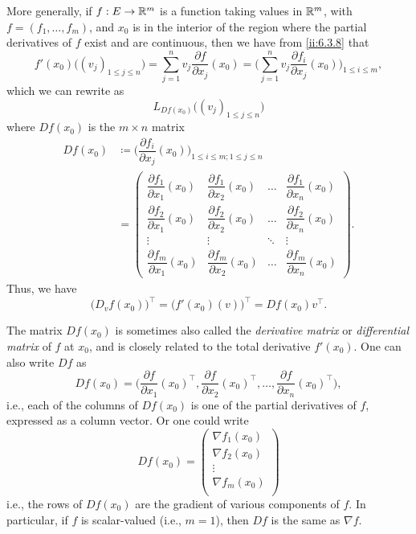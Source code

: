 \begin{ac}\label{ii:ac:6.3.4}
  More generally, if \(f : E \to \mathbb{R}^m\) is a function taking values in \(\mathbb{R}^m\), with \(f = (f_1, \dots, f_m)\), and \(x_0\) is in the interior of the region where the partial derivatives of \(f\) exist and are continuous, then we have from \cref{ii:6.3.8} that
  \[
    f'(x_0)\big((v_j)_{1 \leq j \leq n}\big) = \sum_{j = 1}^n v_j \dfrac{\partial f}{\partial x_j}(x_0) = \bigg(\sum_{j = 1}^n v_j \dfrac{\partial f_i}{\partial x_j}(x_0)\bigg)_{1 \leq i \leq m},
  \]
  which we can rewrite as
  \[
    L_{D f(x_0)}\big((v_j)_{1 \leq j \leq n}\big)
  \]
  where \(D f(x_0)\) is the \(m \times n\) matrix
  \begin{align*}
    D f(x_0) & \coloneqq \bigg(\dfrac{\partial f_i}{\partial x_j}(x_0)\bigg)_{1 \leq i \leq m ; 1 \leq j \leq n}                                      \\
             & = \begin{pmatrix}
                   \dfrac{\partial f_1}{\partial x_1}(x_0) & \dfrac{\partial f_1}{\partial x_2}(x_0) & \dots  & \dfrac{\partial f_1}{\partial x_n}(x_0) \\
                   \dfrac{\partial f_2}{\partial x_1}(x_0) & \dfrac{\partial f_2}{\partial x_2}(x_0) & \dots  & \dfrac{\partial f_2}{\partial x_n}(x_0) \\
                   \vdots                                  & \vdots                                  & \ddots & \vdots                                  \\
                   \dfrac{\partial f_m}{\partial x_1}(x_0) & \dfrac{\partial f_m}{\partial x_2}(x_0) & \dots  & \dfrac{\partial f_m}{\partial x_n}(x_0)
                 \end{pmatrix}.
  \end{align*}
  Thus, we have
  \[
    \big(D_v f(x_0)\big)^\top = \big(f'(x_0)(v)\big)^\top = D f(x_0) v^\top.
  \]

  The matrix \(D f(x_0)\) is sometimes also called the \emph{derivative matrix} or \emph{differential matrix} of \(f\) at \(x_0\), and is closely related to the total derivative \(f'(x_0)\).
  One can also write \(Df\) as
  \[
    D f(x_0) = \bigg(\dfrac{\partial f}{\partial x_1}(x_0)^\top, \dfrac{\partial f}{\partial x_2}(x_0)^\top, \dots, \dfrac{\partial f}{\partial x_n}(x_0)^\top\bigg),
  \]
  i.e., each of the columns of \(D f(x_0)\) is one of the partial derivatives of \(f\), expressed as a column vector.
  Or one could write
  \[
    D f(x_0) = \begin{pmatrix}
      \nabla f_1(x_0) \\
      \nabla f_2(x_0) \\
      \vdots          \\
      \nabla f_m(x_0) \\
    \end{pmatrix}
  \]
  i.e., the rows of \(D f(x_0)\) are the gradient of various components of \(f\).
  In particular, if \(f\) is scalar-valued (i.e., \(m = 1\)), then \(Df\) is the same as \(\nabla f\).
\end{ac}

